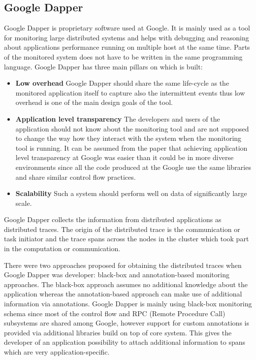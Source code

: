 \subsection{Google Dapper}
Google Dapper is proprietary software used at Google. It is mainly used as a tool for monitoring large distributed systems and helps with debugging and reasoning about applications performance running on multiple host at the same time. Parts of the monitored system does not have to be written in the same programming language. Google Dapper has three main pillars on which is built:
\begin{itemize}
	\item \textbf{Low overhead} \newline
	Google Dapper should share the same life-cycle as the monitored application itself to capture also the intermittent events thus low overhead is one of the main design goals of the tool.
	\item \textbf{Application level transparency} \newline
	The developers and users of the application should not know about the monitoring tool and are not supposed to change the way how they interact with the system when the monitoring tool is running. It can be assumed from the paper that achieving application level transparency at Google was easier than it could be in more diverse environments since all the code produced at the Google use the same libraries and share similar control flow practices.
	\item \textbf{Scalability} \newline
	Such a system should perform well on data of significantly large scale.
\end{itemize}	
Google Dapper collects the information from distributed applications as distributed traces. The origin of the distributed trace is the communication or task initiator and the trace spans across the nodes in the cluster which took part in the computation or communication.
	
There were two approaches proposed for obtaining the distributed traces when Google Dapper was developer: black-box and annotation-based monitoring approaches. The black-box approach assumes no additional knowledge about the application whereas the annotation-based approach can make use of additional information via annotations. Google Dapper is mainly using black-box monitoring schema since most of the control flow and RPC (Remote Procedure Call) subsystems are shared among Google, however support for custom annotations is provided via additional libraries build on top of core system. This gives the developer of an application possibility to attach additional information to spans which are very application-specific.
	

